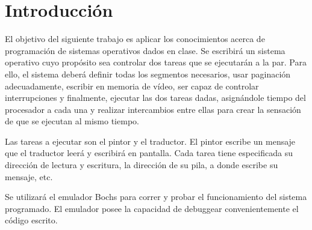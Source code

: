 \section{Introducción}

El objetivo del siguiente trabajo es aplicar los conocimientos acerca de programación de sistemas operativos dados en clase. 
Se escribirá un sistema operativo cuyo propósito sea controlar dos tareas que se ejecutarán a la par.
Para ello, el sistema deberá definir todas los segmentos necesarios, usar paginación adecuadamente, escribir en memoria de vídeo, ser 
capaz de controlar interrupciones y finalmente, ejecutar las dos tareas dadas, asignándole tiempo del procesador a cada una y realizar 
intercambios entre ellas para crear la sensación de que se ejecutan al mismo tiempo.

Las tareas a ejecutar son el pintor y el traductor. El pintor escribe un mensaje que el traductor leerá y escribirá en pantalla. Cada tarea 
tiene especificada su dirección de lectura y escritura, la dirección de su pila, a donde escribe su mensaje, etc. 

Se utilizará el emulador Bochs para correr y probar el funcionamiento del sistema programado. El emulador posee la capacidad de debuggear 
convenientemente el código escrito.

\pagebreak
